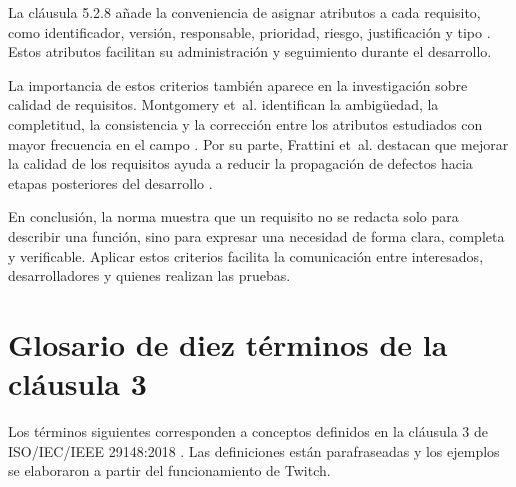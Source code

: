 \documentclass[10pt,a4paper]{article}
\begin{document}
La cláusula 5.2.8 añade la conveniencia de asignar atributos a cada requisito, como identificador, versión, responsable, prioridad, riesgo, justificación y tipo \cite[cl.~5.2.8]{iso29148}. Estos atributos facilitan su administración y seguimiento durante el desarrollo.

La importancia de estos criterios también aparece en la investigación sobre calidad de requisitos. Montgomery et~al. identifican la ambigüedad, la completitud, la consistencia y la corrección entre los atributos estudiados con mayor frecuencia en el campo \cite{montgomery2022}. Por su parte, Frattini et~al. destacan que mejorar la calidad de los requisitos ayuda a reducir la propagación de defectos hacia etapas posteriores del desarrollo \cite{frattini2023}.

En conclusión, la norma muestra que un requisito no se redacta solo para describir una función, sino para expresar una necesidad de forma clara, completa y verificable. Aplicar estos criterios facilita la comunicación entre interesados, desarrolladores y quienes realizan las pruebas.

\section{Glosario de diez términos de la cláusula 3}
Los términos siguientes corresponden a conceptos definidos en la cláusula 3 de ISO/IEC/IEEE 29148:2018 \cite[cl.~3]{iso29148}. Las definiciones están parafraseadas y los ejemplos se elaboraron a partir del funcionamiento de Twitch.
\end{document}
